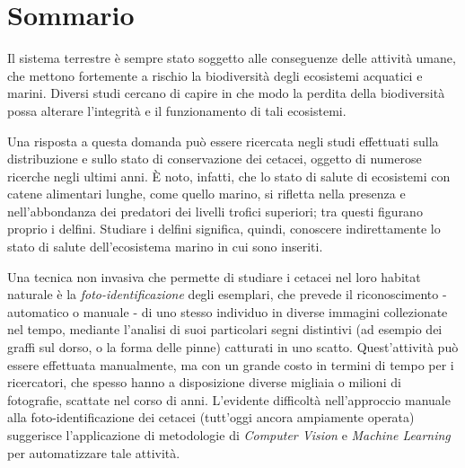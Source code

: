 \documentclass[a4paper,12pt,twoside]{book}
\begin{document}
\begin{frontespizio}
\Rientro{1.5cm}
\Preambolo{\renewcommand{\frontlogosep}{10pt}}
\Preambolo{\renewcommand{\frontpretitlefont}{\fontsize{14}{17}\rmfamily}}
\Preambolo{\renewcommand{\fronttitlefont}{\fontsize{21}{24}\bfseries}}
\end{frontespizio}

\chapter*{Sommario}
Il sistema terrestre è sempre stato soggetto alle conseguenze delle attività umane, che mettono fortemente a rischio la biodiversità degli ecosistemi acquatici e marini. Diversi studi cercano di capire in che modo la perdita della biodiversità possa alterare l’integrità e il funzionamento di tali ecosistemi.

Una risposta a questa domanda può essere ricercata negli studi effettuati sulla distribuzione e sullo stato di conservazione dei cetacei, oggetto di numerose ricerche negli ultimi anni.
È noto, infatti, che lo stato di salute di ecosistemi con catene alimentari lunghe, come quello marino, si rifletta nella presenza e nell’abbondanza dei predatori dei livelli trofici superiori; tra questi figurano proprio i delfini.
Studiare i delfini significa, quindi, conoscere indirettamente lo stato di salute dell’ecosistema
marino in cui sono inseriti.

Una tecnica non invasiva che permette di studiare i cetacei nel loro habitat naturale è la \emph{foto-identificazione} degli esemplari, che prevede il riconoscimento - automatico o manuale - di uno stesso individuo in diverse immagini collezionate nel tempo, mediante l’analisi di suoi particolari segni distintivi (ad esempio dei graffi sul dorso, o la forma delle pinne) catturati in uno scatto.
Quest'attività può essere effettuata manualmente, ma con un grande costo in termini di tempo per i ricercatori, che spesso hanno a disposizione diverse migliaia o milioni di fotografie, scattate nel corso di anni. L'evidente difficoltà nell'approccio manuale alla foto-identificazione dei cetacei (tutt'oggi ancora ampiamente operata) suggerisce l’applicazione di metodologie di \emph{Computer Vision} e \emph{Machine Learning} per automatizzare tale attività.
\end{document}
